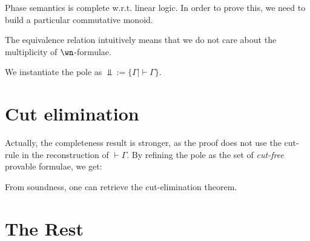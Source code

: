 Phase semantics is complete w.r.t. linear logic. In order to prove this,
we need to build a particular commutative monoid.

The equivalence relation intuitively means that we do not care about the
multiplicity of \(\wn\)-formulae.

We instantiate the pole as \(\Bot := \{\Gamma \mid \vdash\Gamma\}\).

\section{Cut elimination}\label{cut-elimination}

Actually, the completeness result is stronger, as the proof does not use
the cut-rule in the reconstruction of \(\vdash\Gamma\). By refining the
pole as the set of \emph{cut-free} provable formulae, we get:

From soundness, one can retrieve the cut-elimination theorem.

\section{The Rest}\label{the-rest}


